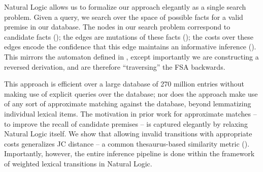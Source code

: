 

Natural Logic allows us to formalize our approach elegantly as
  a single search problem.
Given a query, we search over the space of possible facts for
  a valid premise in our database.
The nodes in our search problem correspond to candidate facts
  ();
  the edges are mutations of these facts (); 
  the costs over these edges encode the confidence that this edge
  maintains an informative inference ().
This mirrors the automaton defined in , except importantly
  we are constructing a reversed derivation, and are therefore
  ``traversing'' the FSA backwards.

This approach is efficient over a large database of 270 million entries
  without making use of explicit queries over the database;
  nor does the approach make use of any sort of approximate
  matching against the database, beyond lemmatizing individual 
  lexical items.
The motivation in prior work for approximate matches --
  to improve the recall of candidate premises -- is captured
  elegantly by relaxing Natural Logic itself.
We show that allowing invalid transitions with appropriate costs
  generalizes JC distance \cite{key:1997jc-similarity} -- a common
  thesaurus-based similarity metric ().
Importantly, however, the entire inference pipeline is done
  within the framework of weighted lexical transitions in Natural
  Logic.


